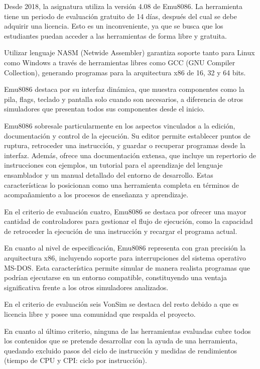 \documentclass[12pt,oneside]{templates/unerthesis}
\begin{document}
Desde 2018, la asignatura utiliza la versión 4.08 de Emu8086. La herramienta tiene un periodo de evaluación gratuito de 14 días, después del cual se debe adquirir una licencia. Esto es un inconveniente, ya que se busca que los estudiantes puedan acceder a las herramientas de forma libre y gratuita.

Utilizar lenguaje NASM (Netwide Assembler) garantiza soporte tanto para Linux como Windows a través de herramientas libres como GCC (GNU Compiler Collection), generando programas para la arquitectura x86 de 16, 32 y 64 bits.

Emu8086 destaca por su interfaz dinámica, que muestra componentes como la pila, flags, teclado y pantalla solo cuando son necesarios, a diferencia de otros simuladores que presentan todos sus componentes desde el inicio.

Emu8086 sobresale particularmente en los aspectos vinculados a la edición, documentación y control de la ejecución. Su editor permite establecer puntos de ruptura, retroceder una instrucción, y guardar o recuperar programas desde la interfaz. Además, ofrece una documentación extensa, que incluye un repertorio de instrucciones con ejemplos, un tutorial para el aprendizaje del lenguaje ensamblador y un manual detallado del entorno de desarrollo. Estas características lo posicionan como una herramienta completa en términos de acompañamiento a los procesos de enseñanza y aprendizaje.

En el criterio de evaluación cuatro, Emu8086 se destaca por ofrecer una mayor cantidad de controladores para gestionar el flujo de ejecución, como la capacidad de retroceder la ejecución de una instrucción y recargar el programa actual.

En cuanto al nivel de especificación, Emu8086 representa con gran precisión la arquitectura x86, incluyendo soporte para interrupciones del sistema operativo MS-DOS. Esta característica permite simular de manera realista programas que podrían ejecutarse en un entorno compatible, constituyendo una ventaja significativa frente a los otros simuladores analizados.

En el criterio de evaluación seis VonSim se destaca del resto debido a que es licencia libre y posee una comunidad que respalda el proyecto.

En cuanto al último criterio, ninguna de las herramientas evaluadas cubre todos los contenidos que se pretende desarrollar con la ayuda de una herramienta, quedando excluido pasos del ciclo de instrucción y medidas de rendimientos (tiempo de CPU y CPI: ciclo por instrucción).
\end{document}

